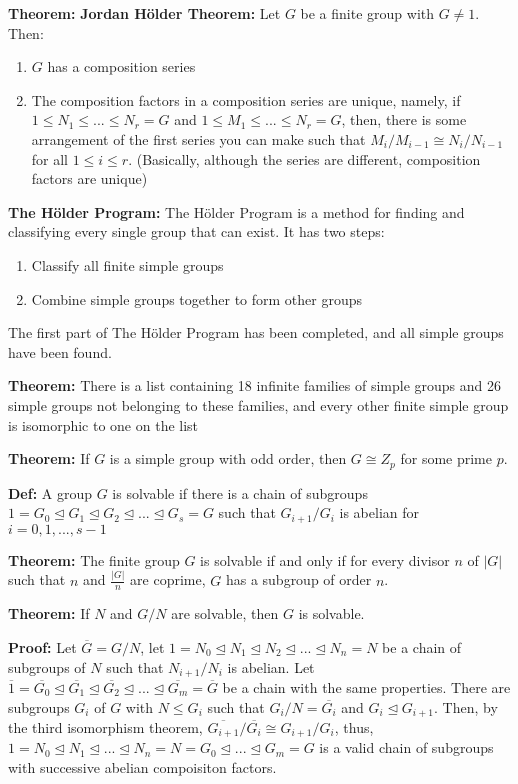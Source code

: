 \documentclass{article}
\begin{document}
\textbf{Theorem:} \textbf{Jordan H\"older Theorem:} Let $G$ be a finite group with $G \neq 1$. Then:
\begin{enumerate}
    \item $G$ has a composition series
    \item The composition factors in a composition series are unique, namely, if $1 \leq N_1 \leq ... \leq N_r = G$ and $1 \leq M_1 \leq ... \leq N_r = G$, then, there is some arrangement of the first series you can make such that $M_i / M_{i-1} \cong N_i/ N_{i-1}$ for all $1\leq i \leq r$. (Basically, although the series are different, composition factors are unique)
\end{enumerate}

\textbf{The H\"older Program:} The H\"older Program is a method for finding and classifying every single group that can exist. It has two steps:
\begin{enumerate}
    \item Classify all finite simple groups
    \item Combine simple groups together to form other groups
\end{enumerate}  

The first part of The H\"older Program has been completed, and all simple groups have been found. 

\textbf{Theorem:} There is a list containing 18 infinite families of simple groups and 26 simple groups not belonging to these families, and every other finite simple group is isomorphic to one on the list

\textbf{Theorem:} If $G$ is a simple group with odd order, then $G \cong Z_p$ for some prime $p$. 

\textbf{Def:} A group $G$ is solvable if there is a chain of subgroups $1=G_0 \trianglelefteq G_1 \trianglelefteq G_2 \trianglelefteq ... \trianglelefteq G_s = G$ such that $G_{i+1}/G_i$ is abelian for $i = 0,1,...,s-1$

\textbf{Theorem:} The finite group $G$ is solvable if and only if for every divisor $n$ of $\vert G\vert$ such that $n$ and $\frac{\vert G\vert}{n}$ are coprime, $G$ has a subgroup of order $n$. 

\textbf{Theorem:} If $N$ and $G/N$ are solvable, then $G$ is solvable. 

\textbf{Proof:} Let $\overline {G} = G/N$, let $1 = N_0 \trianglelefteq N_1 \trianglelefteq N_2 \trianglelefteq ... \trianglelefteq N_n = N$ be a chain of subgroups of $N$ such that $N_{i+1}/N_i$ is abelian. Let $\overline{1} = \overline{G_0} \trianglelefteq \overline{G_1} \trianglelefteq \overline{G_2} \trianglelefteq ... \trianglelefteq \overline{G_m} = \overline{G}$ be a chain with the same properties. There are subgroups $G_i$ of $G$ with $N \leq G_i$ such that $G_i/N = \overline{G_i}$ and $G_i \trianglelefteq G_{i+1}$. Then, by the third isomorphism theorem, $\overline{G_{i+1}}/\overline{G_i} \cong G_{i+1}/G_i$, thus, $1 = N_0 \trianglelefteq N_1 \trianglelefteq ... \trianglelefteq N_n = N = G_0 \trianglelefteq ... \trianglelefteq G_m = G$ is a valid chain of subgroups with successive abelian compoisiton factors.      
\end{document}
